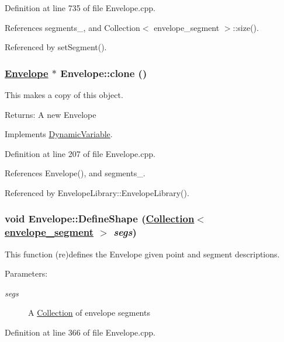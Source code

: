 Definition at line 735 of file Envelope.cpp.

References segments\_\-, and Collection$<$ envelope\_\-segment $>$::size().

Referenced by set\-Segment().\hypertarget{classEnvelope_a5}{
\subsubsection[clone]{\setlength{\rightskip}{0pt plus 5cm}\hyperlink{classEnvelope}{Envelope} $\ast$ Envelope::clone ()}}
\label{classEnvelope_a5}


This makes a copy of this object. \begin{Desc}
\item[Returns:]A new Envelope \end{Desc}


Implements \hyperlink{classDynamicVariable_a2}{Dynamic\-Variable}.

Definition at line 207 of file Envelope.cpp.

References Envelope(), and segments\_\-.

Referenced by Envelope\-Library::Envelope\-Library().\hypertarget{classEnvelope_a8}{
\subsubsection[DefineShape]{\setlength{\rightskip}{0pt plus 5cm}void Envelope::Define\-Shape (\hyperlink{classCollection}{Collection}$<$ \hyperlink{structenvelope__segment}{envelope\_\-segment} $>$ {\em segs})}}
\label{classEnvelope_a8}


This function (re)defines the Envelope given point and segment descriptions. \begin{Desc}
\item[Parameters:]
\begin{description}
\item[{\em segs}]A \hyperlink{classCollection}{Collection} of envelope segments \end{description}
\end{Desc}


Definition at line 366 of file Envelope.cpp.

